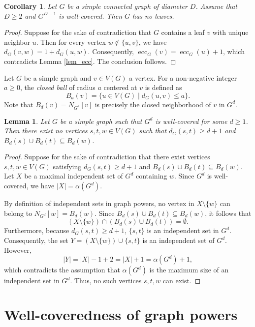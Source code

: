 \documentclass[10pt,a4paper]{amsart}
\numberwithin{equation}{section}
\newtheorem{lem}[thm]{\bf Lemma}
\newtheorem{cor}[thm]{\bf Corollary}
\theoremstyle{definition}
\begin{document}
\begin{cor}
Let $G$ be a simple connected graph of diameter $D$. Assume that $D \ge 2$ and $G^{D-1}$ is well-covered. Then $G$ has no leaves.
\end{cor}

\begin{proof}
Suppose for the sake of contradiction that $G$ contains a leaf $v$ with unique neighbor $u$. Then for every vertex $w \notin \{u, v\}$, we have $d_G(v, w) = 1 + d_G(u, w)$. Consequently, $\operatorname{ecc}_G(v) = \operatorname{ecc}_G(u) + 1$, which contradicts Lemma \ref{lem_ecc}. The conclusion follows.
\end{proof}

Let $G$ be a simple graph and $v \in V(G)$ a vertex. For a non-negative integer $a \ge 0$, the \emph{closed ball} of radius $a$ centered at $v$ is defined as 
\[
B_a(v) = \{u \in V(G) \mid d_G(u,v) \le a\}.
\]
Note that $B_d(v) = N_{G^d}[v]$ is precisely the closed neighborhood of $v$ in $G^d$.

\begin{lem}\label{lem_d2}
Let $G$ be a simple graph such that $G^d$ is well-covered for some $d \ge 1$. Then there exist no vertices $s, t, w \in V(G)$ such that $d_G(s,t) \ge d+1$ and $B_d(s) \cup B_d(t) \subseteq B_d(w)$.
\end{lem}


\begin{proof}
Suppose for the sake of contradiction that there exist vertices $s, t, w \in V(G)$ satisfying $d_G(s,t) \ge d+1$ and $B_d(s) \cup B_d(t) \subseteq B_d(w)$. Let $X$ be a maximal independent set of $G^d$ containing $w$. Since $G^d$ is well-covered, we have $|X| = \alpha(G^d)$.

By definition of independent sets in graph powers, no vertex in $X \setminus \{w\}$ can belong to $N_{G^d}[w] = B_d(w)$. Since $B_d(s) \cup B_d(t) \subseteq B_d(w)$, it follows that 
\[
(X \setminus \{w\}) \cap (B_d(s) \cup B_d(t)) = \emptyset.
\]
Furthermore, because $d_G(s,t) \ge d+1$, $\{s, t\}$ is an independent set in $G^d$. Consequently, the set $Y = (X \setminus \{w\}) \cup \{s, t\}$ is an independent set of $G^d$. However, 
\[
|Y| = |X| - 1 + 2 = |X| + 1 = \alpha(G^d) + 1,
\]
which contradicts the assumption that $\alpha(G^d)$ is the maximum size of an independent set in $G^d$. Thus, no such vertices $s, t, w$ can exist.
\end{proof}


\section{Well-coveredness of graph powers}\label{sec_mains}
\end{document}
